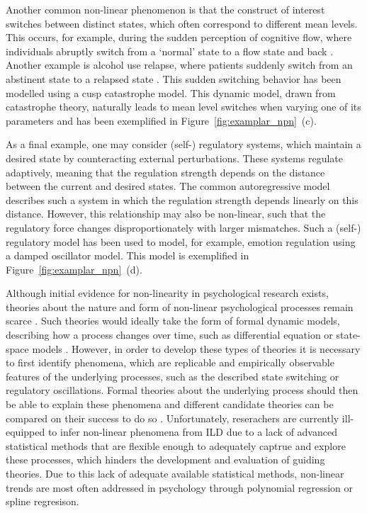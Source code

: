 \documentclass[man, floatsintext]{apa7}
\begin{document}
Another common non-linear phenomenon is that the construct of interest
switches between distinct states, which often correspond to different mean
levels. This occurs, for example, during the sudden perception of cognitive
flow, where individuals abruptly switch from a `normal' state to a flow state
and back \parencite{ceja_suddenly_2012}. Another example is alcohol use
relapse, where patients suddenly switch from an abstinent state to a relapsed
state \parencite{witkiewitz_modeling_2007}. This sudden switching behavior has
been modelled using a cusp catastrophe model. This dynamic model, drawn from
catastrophe theory, naturally leads to mean level switches when varying one
of its parameters \parencite{van_der_maas_sudden_2003,chow_cusp_2015}
and has been exemplified in Figure~\ref{fig:examplar_npn}~(c).

As a final example, one may consider (self-) regulatory systems, which maintain
a desired state by counteracting external perturbations. These systems regulate
adaptively, meaning that the regulation strength depends on the distance
between the
current and desired states. The common autoregressive model describes such a
system in which the regulation strength depends linearly on this distance.
However, this relationship may also be non-linear, such that the
regulatory force changes disproportionately with larger mismatches. Such
a (self-) regulatory model has been used to model, for example, emotion
regulation \parencite{chow_emotion_2005} using a damped oscillator model.
This model is exemplified in Figure~\ref{fig:examplar_npn}~(d).

Although initial evidence for non-linearity in psychological research exists,
theories about the nature and form of non-linear psychological processes remain
scarce \parencite{tan_time-varying_2011}. Such theories would ideally
take the form of formal dynamic models, describing how a process changes over
time, such as differential equation \parencite{cooper_dynamical_2012} or
state-space models \parencite{durbin_time_2012}. However, in order
to develop these types of theories it is
necessary to first identify phenomena, which are replicable and empirically
observable features of the underlying processes, such as the described
state switching or regulatory oscillations. Formal theories about the
underlying process should then be able to explain these phenomena and different
candidate theories can be compared on their success to do so
\parencite{borsboom_theory_2021}.
Unfortunately, reserachers are currently ill-equipped to infer non-linear
phenomena from ILD due to a lack of advanced statistical methods that are
flexible enough to adequately captrue and explore these processes, which
hinders the development and evaluation of guiding theories.
Due to this lack of adequate available statistical methods,
non-linear trends are most often addressed in psychology through polynomial
regression or spline regresison.
\end{document}
